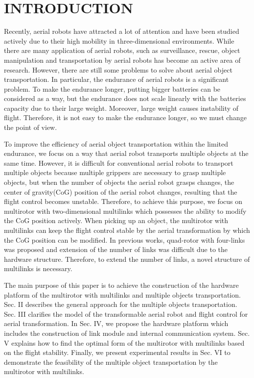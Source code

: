 \section{INTRODUCTION}
Recently, aerial robots have attracted a lot of attention and have been studied actively due to their high mobility in three-dimensional environments\cite{Kumar2012}. While there are many application of aerial robots, such as surveillance\cite{surveillance}, rescue\cite{rescue}, object manipulation and transportation by aerial robots has become an active area of research\cite{lindsey2012}\cite{Mellinger2011}\cite{ZhaoISER2016}\cite{ZhaoICRA2017}\cite{Bernard2009}\cite{Hugh2012}. However, there are still some problems to solve about aerial object transportation. In particular, the endurance of aerial robots is a significant problem. To make the endurance longer, putting bigger batteries can be considered as a way, but the endurance does not scale linearly with the batteries capacity due to their large weight. Moreover, large weight causes instability of flight. Therefore, it is not easy to make the endurance longer, so we must change the point of view. 
\par
To improve the efficiency of aerial object transportation within the limited endurance, we focus on a way that aerial robot transports multiple objects at the same time. However, it is difficult for conventional aerial robots to transport multiple objects because multiple grippers are necessary to grasp multiple objects, but when the number of objects the aerial robot grasps changes, the center of gravity(CoG) position of the aerial robot changes, resulting that the flight control becomes unstable. Therefore, to achieve this purpose, we focus on multirotor with two-dimensional multilinks\cite{Zhao2016} which possesses the ability to modify the CoG position actively. When picking up an object, the multirotor with multilinks can keep the flight control stable by the aerial transformation by which the CoG position can be modified. In previous works\cite{ZhaoISER2016}\cite{ZhaoICRA2017}\cite{Zhao2016}, quad-rotor with four-links was proposed and extension of the number of links was difficult due to the hardware structure. Therefore, to extend the number of links, a novel structure of multilinks is necessary.
\par
The main purpose of this paper is to achieve the construction of the hardware platform of the multirotor with multilinks and multiple objects transportation. Sec. II describes the general approach for the multiple objects transportation. Sec. III clarifies the model of the transformable aerial robot and flight control for aerial transformation. In Sec. IV, we propose the hardware platform which includes the construction of link module and internal communication system. Sec. V explains how to find the optimal form of the multirotor with multilinks based on the flight stability. Finally, we present experimental results in Sec. VI to demonstrate the feasibility of the multiple object transportation by the multirotor with multilinks. 
